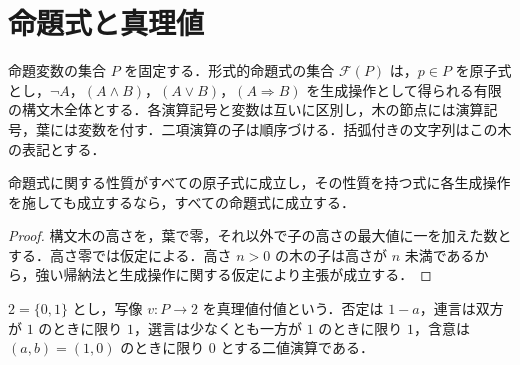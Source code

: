 \section{命題式と真理値}
\begin{defn}[命題式]
命題変数の集合 $P$ を固定する．形式的命題式の集合 $\mathcal F(P)$ は，$p\in P$ を原子式とし，$\neg A$，$(A\land B)$，$(A\lor B)$，$(A\Rightarrow B)$ を生成操作として得られる有限の構文木全体とする．各演算記号と変数は互いに区別し，木の節点には演算記号，葉には変数を付す．二項演算の子は順序づける．括弧付きの文字列はこの木の表記とする．
\end{defn}
\begin{prop}[命題式の構造帰納法]
命題式に関する性質がすべての原子式に成立し，その性質を持つ式に各生成操作を施しても成立するなら，すべての命題式に成立する．
\end{prop}
\begin{proof}
構文木の高さを，葉で零，それ以外で子の高さの最大値に一を加えた数とする．高さ零では仮定による．高さ $n>0$ の木の子は高さが $n$ 未満であるから，強い帰納法と生成操作に関する仮定により主張が成立する．
\end{proof}
\begin{defn}[真理値付値]
$2=\{0,1\}$ とし，写像 $v:P\to 2$ を真理値付値という．否定は $1-a$，連言は双方が $1$ のときに限り $1$，選言は少なくとも一方が $1$ のときに限り $1$，含意は $(a,b)=(1,0)$ のときに限り $0$ とする二値演算である．
\end{defn}
